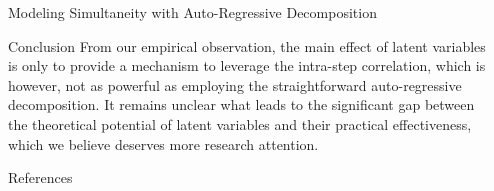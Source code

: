 \documentclass[final]{beamer}
\newlength{\sepwidth}
\newlength{\colwidth}
\newcommand{\separatorcolumn}{\begin{column}{\sepwidth}\end{column}}
\begin{document}
\begin{frame}[t]
\begin{columns}[t]
\begin{column}{\colwidth}
\begin{block}{Modeling Simultaneity with Auto-Regressive Decomposition}
  \end{block}
  \begin{block}{Conclusion}
  	From our empirical observation, the main effect of latent variables is only to provide a mechanism to leverage the intra-step correlation, which is however, not as powerful as employing the straightforward auto-regressive decomposition.
  	It remains unclear what leads to the significant gap between the theoretical potential of latent variables and their practical effectiveness, which we believe deserves more research attention.
  	\vspace{-1.0em}
  \end{block}
  \begin{block}{References}
    \nocite{*}
    \footnotesize{}
  \end{block}

\end{column}

\separatorcolumn
\end{columns}
\end{frame}
\end{document}
